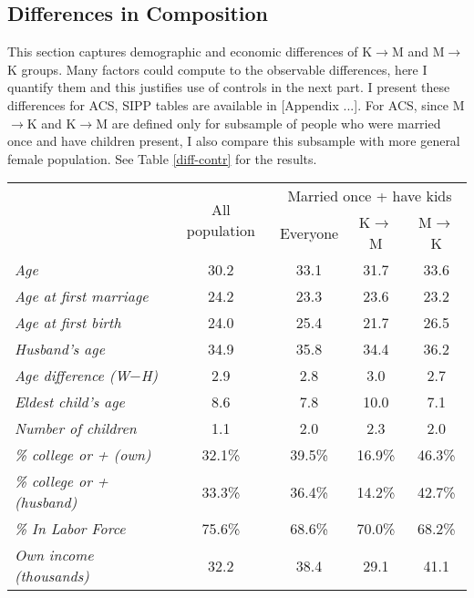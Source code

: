 \documentclass[12pt,letter]{article}
\begin{document}
\subsection{Differences in Composition}
This section captures demographic and economic differences of K$\to$M and M$\to$K groups. Many factors could compute to the observable differences, here I quantify them and this justifies use of controls in the next part. I present these differences for ACS, SIPP tables are available in [Appendix ...]. For ACS, since M$\to$K and K$\to$M are defined only for subsample of people who were married once and have children present, I also compare this subsample with more general female population. See Table \ref{diff-contr} for the results.

\begin{table}[h!]
\begin{center}\small
\begin{tabular}{|l|c|c|c|c|}\cline{2-5}
\multicolumn{1}{c|}{} & \multirow{2}{*}{All population} & \multicolumn{3}{c|}{Married once + have kids}\\\cline{3-5}
\multicolumn{1}{c|}{}  & & Everyone & K$\to$M & M$\to$K \\\cline{2-5}\hline
\textit{Age} & 30.2    &  33.1     &       31.7     &       33.6 \\
\textit{Age at first marriage} & 24.2         &   23.3        &    23.6        &    23.2 \\
\textit{Age at first birth}  & 24.0       &     25.4     &       21.7       &     26.5 \\
\textit{Husband's age} & 34.9        &    35.8      &      34.4   &         36.2  \\
\textit{Age difference (W$-$H)} &  2.9       &      2.8      &       3.0      &       2.7  \\\hline\hline
\textit{Eldest child's age} & 8.6         &    7.8    &        10.0     &        7.1 \\
\textit{Number of children} & 1.1       &      2.0      &       2.3     &       2.0 \\\hline\hline
\textit{\% college or + (own)} & 32.1\%   &         39.5\%     &       16.9\%     &       46.3\% \\
\textit{\% college or + (husband)} & 33.3\%     &       36.4\%     &       14.2\%       &     42.7\% \\\hline\hline
\textit{\% In Labor Force} & 75.6\%    &        68.6\%    &        70.0\%        &    68.2\% \\
\textit{Own income (thousands)} & 32.2 &         38.4 &          29.1 &         41.1 \\

\end{tabular}
\end{center}
\end{table}
\end{document}
